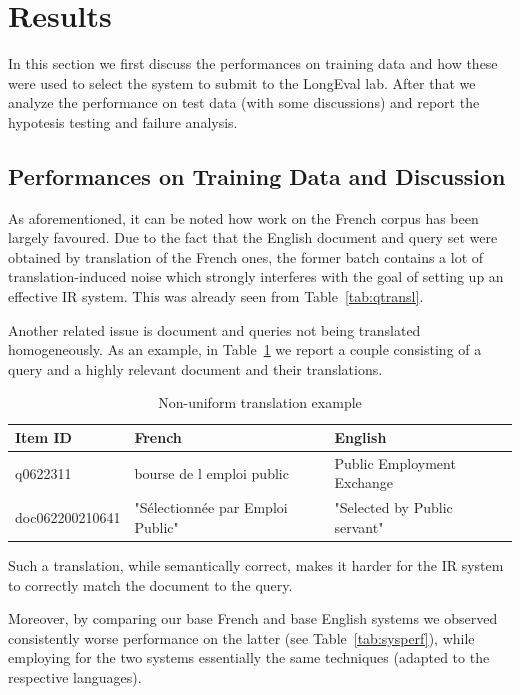 \section{Results}
\label{sec:results}



In this section we first discuss the performances on training data and how these were used to select the system to submit to the LongEval lab. After that we analyze the performance on test data (with some discussions) and report the hypotesis testing and failure analysis.



\subsection{Performances on Training Data and Discussion}
\label{subsec:performances}
As aforementioned, it can be noted how work on the French corpus has been largely favoured.
Due to the fact that the English document and query set were obtained by translation of the French ones, the former batch contains a lot of translation-induced noise which strongly interferes with the goal of setting up an effective IR system. This was already seen from Table~\ref{tab:qtransl}.

\par Another related issue is document and queries not being translated homogeneously. As an example, in Table~\ref{tab:nonuntransl} we report a couple consisting of a query and a highly relevant document and their translations.
\begin{table}[tb]
  \caption{Non-uniform translation example}
  \label{tab:nonuntransl}
  \centering
  \begin{tabular}{|l|l|l|}
    \toprule
    Item ID&French&English\\
    \midrule
    q0622311 & bourse de l emploi public & Public Employment Exchange\\
doc062200210641 & "Sélectionnée par Emploi Public" & "Selected by Public servant"\\
  \bottomrule
\end{tabular}
\end{table}
Such a translation, while semantically correct, makes it harder for the IR system to correctly match the document to the query.
\par Moreover, by comparing our base French and base English systems we observed consistently worse performance on the latter (see Table~\ref{tab:sysperf}), while employing for the two systems essentially the same techniques (adapted to the respective languages).
\par

